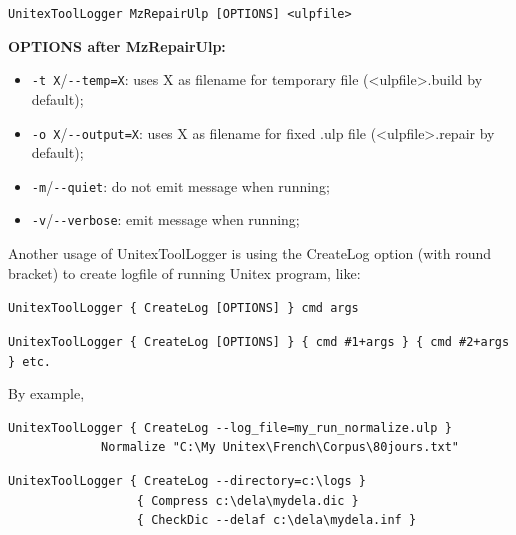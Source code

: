 \bigskip
\verb+UnitexToolLogger MzRepairUlp [OPTIONS] <ulpfile>+

\bigskip
\noindent \textbf{OPTIONS after MzRepairUlp:}
\begin{itemize}
  \item \verb+-t X+/\verb+--temp=X+: uses X as filename for temporary file (<ulpfile>.build by default);
  \item \verb+-o X+/\verb+--output=X+: uses X as filename for fixed .ulp file (<ulpfile>.repair by default);
  \item \verb+-m+/\verb+--quiet+: do not emit message when running;
  \item \verb+-v+/\verb+--verbose+: emit message when running;
\end{itemize}


Another usage of UnitexToolLogger is using the CreateLog option (with round bracket) to create logfile of running Unitex program, like:

\bigskip
\noindent \verb$UnitexToolLogger { CreateLog [OPTIONS] } cmd args$

\bigskip
\noindent \verb$UnitexToolLogger { CreateLog [OPTIONS] } { cmd #1+args } { cmd #2+args } etc.$

By example,
\bigskip
\begin{verbatim}
UnitexToolLogger { CreateLog --log_file=my_run_normalize.ulp }
             Normalize "C:\My Unitex\French\Corpus\80jours.txt"
\end{verbatim}

\bigskip
\begin{verbatim}
UnitexToolLogger { CreateLog --directory=c:\logs }
                  { Compress c:\dela\mydela.dic }
                  { CheckDic --delaf c:\dela\mydela.inf }
\end{verbatim}

